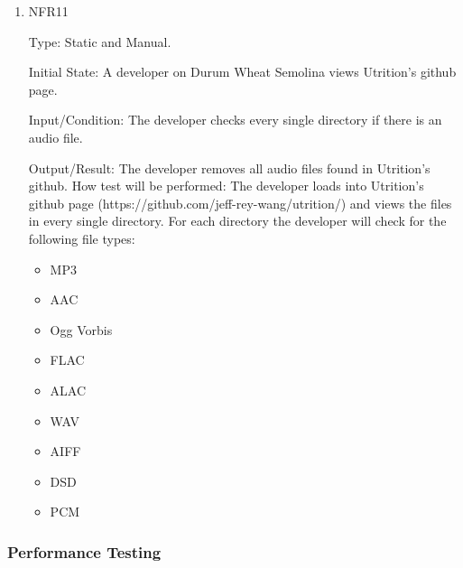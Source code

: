 \documentclass[12pt, titlepage]{article}
\begin{document}
\begin{enumerate}
\item{NFR11\\}

Type: Static and Manual.

Initial State: A developer on Durum Wheat Semolina views Utrition’s github page. 

Input/Condition: The developer checks every single directory if there is an audio file.

Output/Result: The developer removes all audio files found in Utrition’s github.
How test will be performed: The developer loads into Utrition’s github page (https://github.com/jeff-rey-wang/utrition/) and views the files in every single directory. For each directory the developer will check for the following file types:

\begin{itemize}
	\item MP3
	\item AAC
	\item Ogg Vorbis
	\item FLAC
	\item ALAC
	\item WAV
	\item AIFF
	\item DSD
	\item PCM
\end{itemize}
\end{enumerate}

\subsubsection{Performance Testing}

\end{document}
